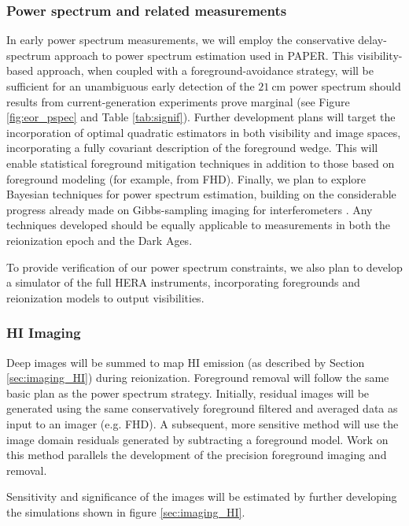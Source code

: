 \documentclass[preprint]{aastex}
\begin{document}

\subsubsection{Power spectrum and related measurements}

In early power spectrum measurements, we will employ the conservative delay-spectrum approach to power spectrum estimation used in PAPER.  This visibility-based approach, when coupled with a foreground-avoidance strategy, will be sufficient for an unambiguous early detection of the $21~\textrm{cm}$ power spectrum should results from current-generation experiments prove marginal (see Figure \ref{fig:eor_pspec} and Table \ref{tab:signif}).  Further development plans will target the incorporation of optimal quadratic estimators \citep{liu_tegmark2011,dillon_et_al2013a} in both visibility and image spaces, incorporating a fully covariant description of the foreground wedge.  This will enable statistical foreground mitigation techniques in addition to those based on foreground modeling (for example, from FHD).  Finally, we plan to explore Bayesian techniques for power spectrum estimation, building on the considerable progress already made on Gibbs-sampling imaging for interferometers \cite{sutter_et_al2014}.  Any techniques developed should be equally applicable to measurements in both the reionization epoch and the Dark Ages.

To provide verification of our power spectrum constraints, we also plan to develop a simulator of the full HERA instruments, incorporating foregrounds and reionization models to output visibilities.

\subsubsection{HI Imaging}
Deep images will be summed to map HI emission (as described by Section \ref{sec:imaging_HI}) during reionization.   Foreground removal will follow the same basic plan as the power spectrum strategy.  Initially, residual images will be generated using the same conservatively foreground filtered and averaged data as input to an imager (e.g. FHD).  A subsequent, more sensitive method will use the image domain residuals generated by subtracting a foreground model.  Work on this method parallels the development of the precision foreground imaging and removal.

Sensitivity and significance of the images will be estimated by further developing the simulations shown in figure \ref{sec:imaging_HI}.  
\end{document}

